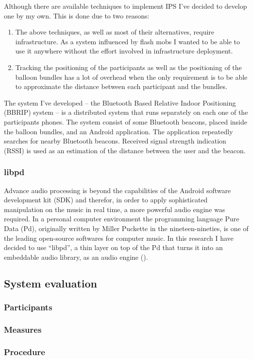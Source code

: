 Although there are available techniques to implement IPS I've decided to develop one by my own. This is done due to two reasons:
\begin{enumerate}
	\item{The above techniques, as well as most of their alternatives, require infrastructure. As a system influenced by flash mobs I wanted to be able to use it anywhere without the effort involved in infrastructure deployment.}
	\item{Tracking the positioning of the participants as well as the positioning of the balloon bundles has a lot of overhead when the only requirement is to be able to approximate the distance between each participant and the bundles.}
\end{enumerate}


The system I've developed -- the Bluetooth Based Relative Indoor Positioning (BBRIP) system -- is a distributed system that runs separately on each one of the participants phones. The system consist of some Bluetooth beacons, placed inside the balloon bundles, and an Android application. The application repeatedly searches for nearby Bluetooth beacons. Received signal strength indication (RSSI) is used as an estimation of the distance between the user and the beacon.

\subsubsection{libpd}
Advance audio processing is beyond the capabilities of the Android software development kit (SDK) and therefor, in order to apply sophisticated manipulation on the music in real time, a more powerful audio engine was required. In a personal computer environment the programming language Pure Data (Pd), originally written by Miller Puckette in the nineteen-nineties, is one of the leading open-source softwares for computer music. In this research I have decided to use ``libpd'', a thin layer on top of the Pd that turns it into an embeddable audio library, as an audio engine ().

\subsection{System evaluation}


\subsubsection{Participants}

\subsubsection{Measures}

\subsubsection{Procedure}